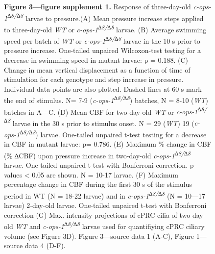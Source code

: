 \documentclass[
  11pt,
]{article}
\begin{document}
\begin{figure}[H]
\caption{\textbf{Figure 3---figure supplement 1. } Response of
three-day-old \emph{c-ops-1\textsuperscript{∆8/∆8}} larvae to
pressure.(A) Mean pressure increase steps applied to three-day-old
\emph{WT} or \emph{c-ops-1\textsuperscript{∆8/∆8}} larvae. (B) Average
swimming speed per batch of \emph{WT} or
\emph{c-ops-1\textsuperscript{∆8/∆8}} larvae in the 10 s prior to
pressure increase. One-tailed unpaired Wilcoxon-test testing for a
decrease in swimming speed in mutant larvae: p = 0.188. (C) Change in
mean vertical displacement as a function of time of stimulation for each
genotype and step increase in pressure. Individual data points are also
plotted. Dashed lines at 60 s mark the end of stimulus. N= 7-9
(\emph{c-ops-1\textsuperscript{∆8/∆8}}) batches, N = 8-10 (\emph{WT})
batches in A---C. (D) Mean CBF for two-day-old \emph{WT} or
\emph{c-ops-1\textsuperscript{∆8/∆8}} larvae in the 30 s prior to
stimulus onset. N = 29 (\emph{WT}) 19
(\emph{c-ops-1\textsuperscript{∆8/∆8}}) larvae. One-tailed unpaired
t-test testing for a decrease in CBF in mutant larvae: p= 0.786. (E)
Maximum \% change in CBF (\% ∆CBF) upon pressure increase in two-day-old
\emph{c-ops-1\textsuperscript{∆8/∆8}} larvae. One-tailed unpaired t-test
with Bonferroni correction. p-values \textless{} 0.05 are shown. N =
10-17 larvae. (F) Maximum percentage change in CBF during the first 30 s
of the stimulus period in WT (N = 18-22 larvae) and in
\emph{c-ops-1\textsuperscript{∆8/∆8}} (N = 10---17 larvae) 2-day-old
larvae. One-tailed unpaired t-test with Bonferroni correction (G) Max.
intensity projections of cPRC cilia of two-day-old \emph{WT} and
\emph{c-ops-1\textsuperscript{∆8/∆8}} larvae used for quantifiying cPRC
ciliary volume (see Figure 3D). Figure 3---source data 1 (A-C), Figure
1---source data 4 (D-F).}

\end{figure}%
\end{document}

